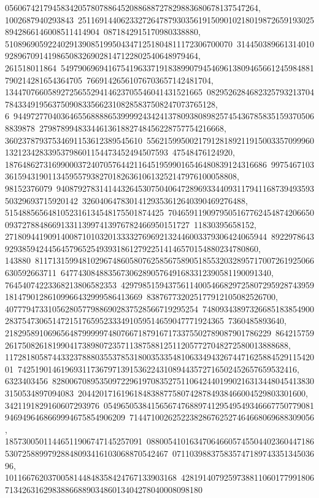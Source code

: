 {{{05606742179458342057807886452088688727829883680678137547264, 1002687940293843\
25116914406233272647879303561915090102180198726591930258942866146008511414904\
0871842915170980338880, 51089690592240291390851995043471251804811172306700070\
314450389661314010928967091419865083269028147122802540648979464, 261518011864\
54979069694167541963371918389907945469613809465661245984881790214281654364705\
76691426561076703657142481704, 1344707660589272565529414623705546041431521665\
08295262846823257932137047843349195637509083356623108285837508247073765128, 6\
94497277040364655688886539999243424137809380898257454367858351593705068839878\
2798789948334461361882748456228757754216668, 36023787937534691153612389545610\
55621599500217912818921191500335709996013212342833953798601154473452494507593\
47548476124920, 1876486273169900037240705764421164519599016546480839124316686\
9975467103361594319011345955793827018263610613252147976100058808, 98152376079\
94087927831414432645307504064728969334409311794116873949359350329693715920142\
32604064783014129353612640390469276488, 5154885656481052316134548175501874425\
70465911909795051677624548742066500937278848669133113997413976782466950151727\
11830395658152, 2718094419091400871010320133332769692132446003379306424065944\
892297864392938594244564579652549393186127922514146570154880234780860, 143880\
81171315994810296748605807625856758905185532032895717007261925066630592663711\
6477430848835673062890576491683312390581190091340, 76454074223368213806582353\
42979851594375611400546682972580729592874395918147901286109966432999586413669\
838767732025177912105082526700, 407779473310562805779886902837528566719295254\
74809343897326685183854900283754730651472151765952333491059514659047771924365\
7360485893640, 21829589106965648799999748076671879167173375502789087901786229\
864215759261750826181990417389807235711387588125112057727048272580013888688, 
   11728180587443323788803553785318003533548106334943267447162588452911542001\
74251901461969311736797139153622431089443572716502452657659532416, 6323403456\
82800670895350972296197083527511064244019902163134480454138303150534897094083\
20442017161961848388775807428784938466004529803301600, 3421191829160607293976\
05496505384156567476889741295495493466677507790819469496468669994675854906209\
7144710026252238286762527464668069688309056, 18573005011446511906747145257091\
08800541016347064660574550440236044718653072588997928848093416103068870542467\
07110398837583574718974335134503696, 1011667620370058144848358424767133903168\
42819140792597388110601779918067134263162983886688903486013404278040008098180\
}}}
